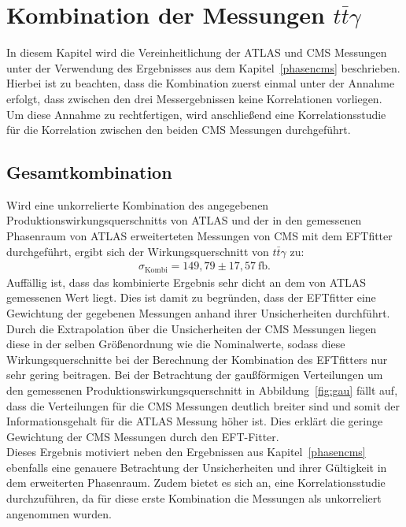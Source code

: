 \chapter{Kombination der Messungen \texorpdfstring {$t\bar{t}\gamma$}{math}}
In diesem Kapitel wird die Vereinheitlichung der ATLAS und CMS Messungen unter der Verwendung des Ergebnisses aus dem Kapitel~\ref{phasencms} beschrieben. Hierbei ist zu beachten, dass die Kombination zuerst einmal unter der Annahme erfolgt, dass zwischen den drei Messergebnissen keine Korrelationen vorliegen. Um diese Annahme zu rechtfertigen, wird anschließend eine Korrelationsstudie für die Korrelation zwischen den beiden CMS Messungen durchgeführt.

\section{Gesamtkombination}
\label{kombi}
Wird eine unkorrelierte Kombination des angegebenen Produktionswirkungsquerschnitts von ATLAS und der in den gemessenen Phasenraum von ATLAS erweiterteten Messungen von CMS mit dem EFTfitter durchgeführt, ergibt sich der Wirkungsquerschnitt von $t\bar{t}\gamma$ zu:
\begin{align}
  \sigma_{\text{Kombi}} = 149,79 \pm 17,57~ \si{\femto\barn}.
\end{align}
Auffällig ist, dass das kombinierte Ergebnis sehr dicht an dem von ATLAS gemessenen Wert liegt.
Dies ist damit zu begründen, dass der EFTfitter eine Gewichtung der gegebenen Messungen anhand ihrer Unsicherheiten durchführt.
Durch die Extrapolation über die Unsicherheiten der CMS Messungen liegen diese in der selben Größenordnung wie die Nominalwerte, sodass diese Wirkungsquerschnitte bei der Berechnung der Kombination des EFTfitters nur sehr gering beitragen. Bei der Betrachtung der gaußförmigen Verteilungen um den gemessenen Produktionswirkungsquerschnitt in Abbildung~\ref{fig:gau} fällt auf, dass die Verteilungen für die CMS Messungen deutlich breiter sind und somit der Informationsgehalt für die ATLAS Messung höher ist. Dies erklärt die geringe Gewichtung der CMS Messungen durch den EFT-Fitter.\\
Dieses Ergebnis motiviert neben den Ergebnissen aus Kapitel~\ref{phasencms} ebenfalls eine genauere Betrachtung der Unsicherheiten und ihrer Gültigkeit in dem erweiterten Phasenraum. Zudem bietet es sich an, eine Korrelationsstudie durchzuführen, da für diese erste Kombination die Messungen als unkorreliert angenommen wurden.

